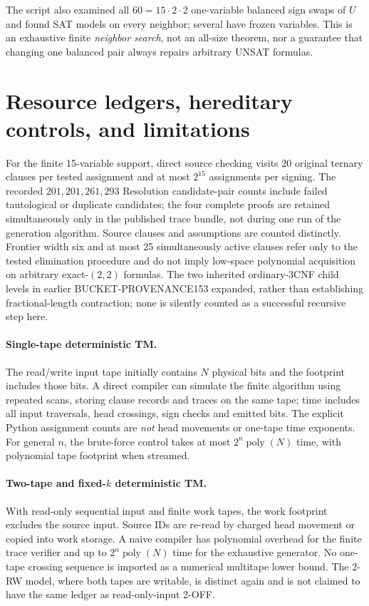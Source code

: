 \documentclass[11pt]{article}
\begin{document}
The script also examined all $60=15\cdot2\cdot2$ one-variable balanced sign swaps of $U$ and found SAT models on every neighbor; several have frozen variables. This is an exhaustive finite \emph{neighbor search}, not an all-size theorem, nor a guarantee that changing one balanced pair always repairs arbitrary UNSAT formulas.

\section{Resource ledgers, hereditary controls, and limitations}
For the finite 15-variable support, direct source checking visits 20 original ternary clauses per tested assignment and at most $2^{15}$ assignments per signing. The recorded $201,201,261,293$ Resolution candidate-pair counts include failed tautological or duplicate candidates; the four complete proofs are retained simultaneously only in the published trace bundle, not during one run of the generation algorithm. Source clauses and assumptions are counted distinctly. Frontier width six and at most 25 simultaneously active clauses refer only to the tested elimination procedure and do not imply low-space polynomial acquisition on arbitrary exact-$(2,2)$ formulas. The two inherited ordinary-3CNF child levels in earlier BUCKET-PROVENANCE153 expanded, rather than establishing fractional-length contraction; none is silently counted as a successful recursive step here.

\paragraph{Single-tape deterministic TM.} The read/write input tape initially contains $N$ physical bits and the footprint includes those bits. A direct compiler can simulate the finite algorithm using repeated scans, storing clause records and traces on the same tape; time includes all input traversals, head crossings, sign checks and emitted bits. The explicit Python assignment counts are \emph{not} head movements or one-tape time exponents. For general $n$, the brute-force control takes at most $2^n\operatorname{poly}(N)$ time, with polynomial tape footprint when streamed.

\paragraph{Two-tape and fixed-$k$ deterministic TM.} With read-only sequential input and finite work tapes, the work footprint excludes the source input. Source IDs are re-read by charged head movement or copied into work storage. A naive compiler has polynomial overhead for the finite trace verifier and up to $2^n\operatorname{poly}(N)$ time for the exhaustive generator. No one-tape crossing sequence is imported as a numerical multitape lower bound. The 2-RW model, where both tapes are writable, is distinct again and is not claimed to have the same ledger as read-only-input 2-OFF.
\end{document}
